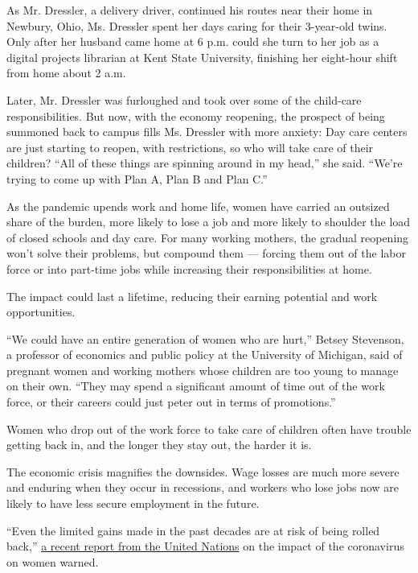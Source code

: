 As Mr. Dressler, a delivery driver, continued his routes near their home
in Newbury, Ohio, Ms. Dressler spent her days caring for their
3-year-old twins. Only after her husband came home at 6 p.m. could she
turn to her job as a digital projects librarian at Kent State
University, finishing her eight-hour shift from home about 2 a.m.

Later, Mr. Dressler was furloughed and took over some of the child-care
responsibilities. But now, with the economy reopening, the prospect of
being summoned back to campus fills Ms. Dressler with more anxiety: Day
care centers are just starting to reopen, with restrictions, so who will
take care of their children? ``All of these things are spinning around
in my head,'' she said. ``We're trying to come up with Plan A, Plan B
and Plan C.''

As the pandemic upends work and home life, women have carried an
outsized share of the burden, more likely to lose a job and more likely
to shoulder the load of closed schools and day care. For many working
mothers, the gradual reopening won't solve their problems, but compound
them --- forcing them out of the labor force or into part-time jobs
while increasing their responsibilities at home.

The impact could last a lifetime, reducing their earning potential and
work opportunities.

``We could have an entire generation of women who are hurt,'' Betsey
Stevenson, a professor of economics and public policy at the University
of Michigan, said of pregnant women and working mothers whose children
are too young to manage on their own. ``They may spend a significant
amount of time out of the work force, or their careers could just peter
out in terms of promotions.''

Women who drop out of the work force to take care of children often have
trouble getting back in, and the longer they stay out, the harder it is.

The economic crisis magnifies the downsides. Wage losses are much more
severe and enduring when they occur in recessions, and workers who lose
jobs now are likely to have less secure employment in the future.

``Even the limited gains made in the past decades are at risk of being
rolled back,''
\href{https://www.unfpa.org/sites/default/files/resource-pdf/COVID-19_A_Gender_Lens_Guidance_Note.pdf}{a
recent report from the United Nations} on the impact of the coronavirus
on women warned.


